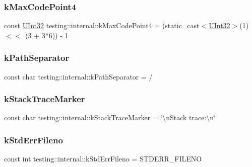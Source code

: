 \subsubsection{\texorpdfstring{kMaxCodePoint4}{kMaxCodePoint4}}
{\footnotesize\ttfamily const \mbox{\hyperlink{namespacetesting_1_1internal_a40d4fffcd2bf56f18b1c380615aa85e3}{U\+Int32}} testing\+::internal\+::k\+Max\+Code\+Point4 = (static\+\_\+cast$<$\mbox{\hyperlink{namespacetesting_1_1internal_a40d4fffcd2bf56f18b1c380615aa85e3}{U\+Int32}}$>$(1) $<$$<$ (3 + 3$\ast$6)) -\/ 1}

\mbox{\label{namespacetesting_1_1internal_afcd71adaa9d1e6df7b282a17fc48125c}} 
\subsubsection{\texorpdfstring{kPathSeparator}{kPathSeparator}}
{\footnotesize\ttfamily const char testing\+::internal\+::k\+Path\+Separator = \textquotesingle{}/\textquotesingle{}}

\mbox{\label{namespacetesting_1_1internal_abb38528ca6a45df265b19f5ccb3d16d9}} 
\subsubsection{\texorpdfstring{kStackTraceMarker}{kStackTraceMarker}}
{\footnotesize\ttfamily const char testing\+::internal\+::k\+Stack\+Trace\+Marker = \char`\"{}\textbackslash{}n\+Stack trace\+:\textbackslash{}n\char`\"{}}

\mbox{\label{namespacetesting_1_1internal_a747eccfdbdee3ff8af3bedc476a57c85}} 
\subsubsection{\texorpdfstring{kStdErrFileno}{kStdErrFileno}}
{\footnotesize\ttfamily const int testing\+::internal\+::k\+Std\+Err\+Fileno = S\+T\+D\+E\+R\+R\+\_\+\+F\+I\+L\+E\+NO}

